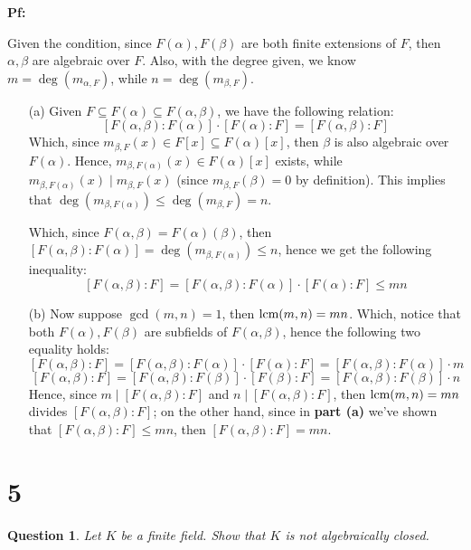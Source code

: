 \documentclass{article}
\newtheorem{question}{Question}
\begin{document}
\textbf{Pf:}

Given the condition, since $F(\alpha),F(\beta)$ are both finite extensions of $F$, then $\alpha,\beta$ are algebraic over $F$. Also, with the degree given, we know $m = \deg(m_{\alpha,F})$, while $n=\deg(m_{\beta,F})$.
\begin{itemize}
    \item[(a)]
    Given $F\subseteq F(\alpha)\subseteq F(\alpha,\beta)$, we have the following relation:
    $$[F(\alpha,\beta):F(\alpha)]\cdot [F(\alpha):F]=[F(\alpha,\beta):F]$$
    Which, since $m_{\beta,F}(x)\in F[x]\subseteq F(\alpha)[x]$, then $\beta$ is also algebraic over $F(\alpha)$. Hence, $m_{\beta,F(\alpha)}(x)\in F(\alpha)[x]$ exists, while $m_{\beta,F(\alpha)}(x)\mid m_{\beta,F}(x)$ (since $m_{\beta,F}(\beta)=0$ by definition).
    This implies that $\deg(m_{\beta,F(\alpha)})\leq \deg(m_{\beta,F}) = n$.

    Which, since $F(\alpha,\beta) = F(\alpha)(\beta)$, then $[F(\alpha,\beta):F(\alpha)] = \deg(m_{\beta,F(\alpha)}) \leq n$, hence we get the following inequality:
    $$[F(\alpha,\beta):F]=[F(\alpha,\beta):F(\alpha)]\cdot [F(\alpha):F]\leq mn$$

    \hfil

    \item[(b)] Now suppose $\gcd(m,n)=1$, then $\textmd{lcm}(m,n)=mn$. Which, notice that both $F(\alpha),F(\beta)$ are subfields of $F(\alpha,\beta)$, hence the following two equality holds:
    $$[F(\alpha,\beta):F]=[F(\alpha,\beta):F(\alpha)]\cdot [F(\alpha):F] = [F(\alpha,\beta):F(\alpha)]\cdot m$$
    $$[F(\alpha,\beta):F]=[F(\alpha,\beta):F(\beta)]\cdot [F(\beta):F] = [F(\alpha,\beta):F(\beta)]\cdot n$$
    Hence, since $m\mid [F(\alpha,\beta):F]$ and $n\mid [F(\alpha,\beta):F]$, then $\textmd{lcm}(m,n)=mn$ divides $[F(\alpha,\beta):F]$; on the other hand, since in \textbf{part (a)} we've shown that $[F(\alpha,\beta):F]\leq mn$, then $[F(\alpha,\beta):F] = mn$.
\end{itemize}

\break

\section*{5}
\begin{myBox}[]{}
    \begin{question}
        Let $K$ be a finite field. Show that $K$ is not algebraically closed.
    \end{question}
\end{myBox}
\end{document}
